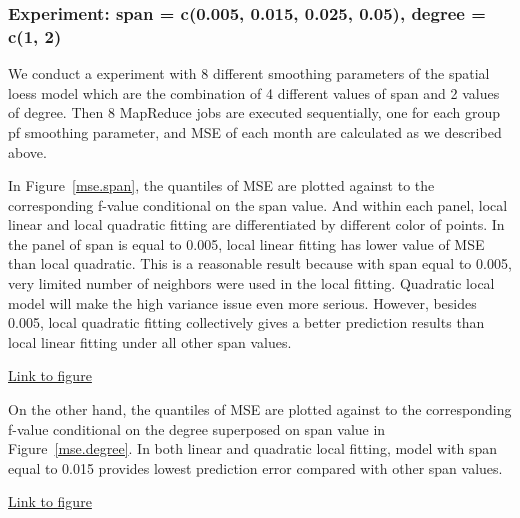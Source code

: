 \subsubsection{Experiment: span = c(0.005, 0.015, 0.025, 0.05), degree = c(1, 2)}

We conduct a experiment with 8 different smoothing parameters of the spatial loess
model which are the combination of 4 different values of span and 2 values of
degree. Then 8 MapReduce jobs are executed sequentially, one for each group pf 
smoothing parameter, and MSE of each month are calculated as we described above.

In Figure~\href{../plots/a1950/spafit/QuanMABSE.a1950.tmax.span.pdf}
{\ref*{mse.span}}, the quantiles of MSE are plotted against to the corresponding
f-value conditional on the span value. And within each panel, local linear and 
local quadratic fitting are differentiated by different color of points. In the 
panel of span is equal to 0.005, local linear fitting has lower value of MSE 
than local quadratic. This is a reasonable result because with span equal to 
0.005, very limited number of neighbors were used in the local fitting. Quadratic
local model will make the high variance issue even more serious. However, besides 
0.005, local quadratic fitting collectively gives a better prediction results 
than local linear fitting under all other span values.

\begin{framed}
\begin{center}
  \href{../plots/a1950/spafit/QuanMABSE.a1950.tmax.span.pdf}{Link to figure}
  \label{mse.span}
\end{center}
\end{framed}

On the other hand, the quantiles of MSE are plotted against to the corresponding
f-value conditional on the degree superposed on span value in 
Figure~\href{../plots/a1950/spafit/QuanMABSE.a1950.tmax.degree.pdf}
{\ref*{mse.degree}}. In both linear and quadratic local fitting, model with span
equal to 0.015 provides lowest prediction error compared with other span values.

\begin{framed}
\begin{center}
  \href{../plots/a1950/spafit/QuanMABSE.a1950.tmax.degree.pdf}{Link to figure}
  \label{mse.degree}
\end{center}
\end{framed}

